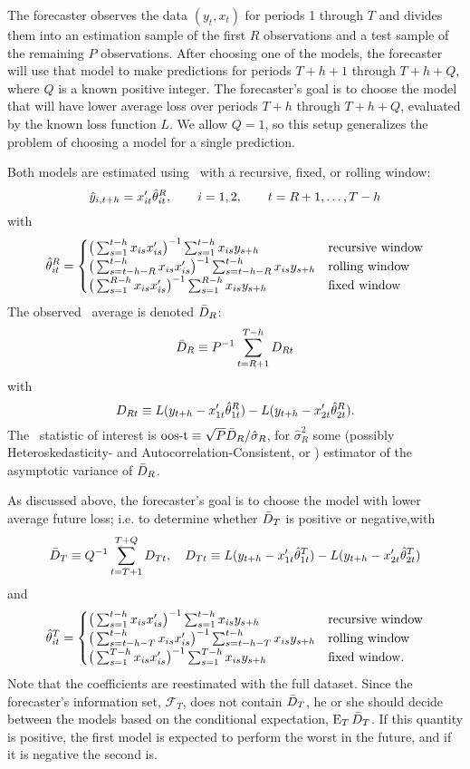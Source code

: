 \documentclass[11pt]{article}
\begin{document}
The forecaster observes the data $(y_t,x_t)$ for periods 1 through $T$
and divides them into an estimation sample of the first $R$
observations and a test sample of the remaining $P$ observations.
After choosing one of the models, the forecaster will use that model
to make predictions for periods $T + h + 1$ through $T + h + Q$, where
$Q$ is a known positive integer.  The forecaster's goal is to choose
the model that will have lower average loss over periods $T+h$ through
$T+h+Q$, evaluated by the known loss function $L$.  We allow $Q = 1$,
so this setup generalizes the problem of choosing a model for a single
prediction.

Both models are estimated using \ols\ with a recursive, fixed, or
rolling window:
\[
\hat y_{i,t+h} = x_{it}'\hat{\theta}_{it}^{R}, \qquad i=1,2, \qquad t
= R+1,\dots,T-h
\]
with
\begin{equation*}
  \hat\theta_{it}^{R} =  
  \begin{cases}\big(\sum_{s=1}^{t-h} x_{is}x_{is}'\big)^{-1}
    \sum_{s=1}^{t-h} x_{is} y_{s+h} & \text{recursive window}\\
    \big(\sum_{s=t - h - R}^{t-h} x_{is}x_{is}'\big)^{-1}
    \sum_{s=t - h - R}^{t-h} x_{is} y_{s+h} & \text{rolling window}\\
    \big(\sum_{s=1}^{R-h} x_{is}x_{is}'\big)^{-1} \sum_{s=1}^{R-h}
    x_{is} y_{s+h} & \text{fixed window}
  \end{cases}
\end{equation*}
The observed \oos\ average is denoted $\bar{D}_{R}$: \[\bar{D}_{R} \equiv P^{-1}
\sum_{t=R+1}^{T-h} D_{Rt}\]  with
\[
D_{Rt} \equiv L(y_{t+h} - x_{1t}'\hat\theta_{1t}^R) - L(y_{t+h}
  - x_{2t}'\hat\theta_{2t}^R).
\]
The \oos\ statistic of interest is $\operatorname{oos-t} \equiv \sqrt{P} \bar{D}_{R} /
\hat\sigma_R$, for $\hat\sigma_R^2$ some (possibly Heteroskedasticity- and
Autocorrelation-Consistent, or \hac) estimator of the asymptotic
variance of $\bar{D}_{R}$.

As discussed above, the forecaster's goal is to choose the model with
lower average future loss; i.e. to determine whether $\bar{D}_{T}$ is
positive or negative,with
\[
\bar{D}_{T} \equiv Q^{-1} \sum_{t=T+1}^{T+Q} D_{Tt}, \quad 
D_{Tt} \equiv L(y_{t+h} - x_{1t}' \hat\theta_{1t}^T) - L(y_{t+h} - x_{2t}' \hat\theta_{2t}^T)
\]
and 
\begin{equation*}
  \hat\theta_{it}^{T} = 
  \begin{cases} \big(\sum_{s=1}^{t-h} x_{is}x_{is}'\big)^{-1}
    \sum_{s=1}^{t-h} x_{is} y_{s+h} & \text{recursive window} \\
    \big(\sum_{s=t - h - T}^{t-h} x_{is}x_{is}'\big)^{-1}
    \sum_{s=t - h - T}^{t-h} x_{is} y_{s+h} & \text{rolling window} \\
    \big(\sum_{s=1}^{T-h} x_{is}x_{is}'\big)^{-1} 
    \sum_{s=1}^{T-h} x_{is} y_{s+h} & \text{fixed window}.
  \end{cases}
\end{equation*}
Note that the coefficients are reestimated with the full dataset.
Since the forecaster's information set, $\mathcal{F}_T$, does not
contain $\bar{D}_{T}$, he or she should decide between the models based on
the conditional expectation, $\operatorname{E}_T \bar{D}_{T}$. If this quantity is
positive, the first model is expected to perform the worst in the
future, and if it is negative the second is.
\end{document}
